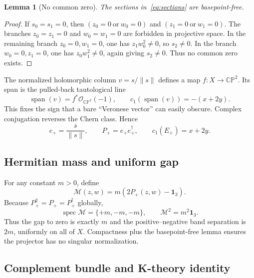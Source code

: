 \documentclass[11pt]{article}
\newtheorem{lemma}[theorem]{Lemma}
\theoremstyle{definition}
\theoremstyle{remark}
\newcommand{\CP}{\mathbb {CP}}
\newcommand{\cO}{\mathcal O}
\newcommand{\cM}{\mathcal M}
\begin{document}
\begin{lemma}[No common zero]
The sections in~\eqref{eq:sections} are basepoint-free.
\end{lemma}
\begin{proof}
If \(s_0=s_1=0\), then
\((z_0=0\ \text{or}\ w_0=0)\) and
\((z_1=0\ \text{or}\ w_1=0)\).  The branches
\(z_0=z_1=0\) and \(w_0=w_1=0\) are forbidden in projective space.  In the
remaining branch \(z_0=0,w_1=0\), one has
\(z_1w_0^2\ne0\), so \(s_2\ne0\).  In the branch
\(w_0=0,z_1=0\), one has \(z_0w_1^2\ne0\), again giving \(s_2\ne0\).
Thus no common zero exists.
\end{proof}

The normalized holomorphic column \(v=s/\lVert s\rVert\) defines a map
\(f:X\to\CP^2\).  Its span is the pulled-back tautological line
\[
 \operatorname{span}(v)=f^*\cO_{\CP^2}(-1),
 \qquad c_1(\operatorname{span}(v))=-(x+2y).
\]
This fixes the sign that a bare ``Veronese vector'' can easily obscure.
Complex conjugation reverses the Chern class.  Hence
\begin{equation}
 e_+=\frac{\overline{s}}{\lVert s\rVert},
 \qquad
 P_+=e_+e_+^\dagger,
 \qquad
 c_1(E_+)=x+2y.
 \label{eq:positive-projector}
\end{equation}

\subsection{Hermitian mass and uniform gap}

For any constant \(m>0\), define
\begin{equation}
 \cM(z,w)=m(2P_+(z,w)-\bm1_3).
 \label{eq:rank-three-mass}
\end{equation}
Because \(P_+^2=P_+=P_+^\dagger\) globally,
\begin{equation}
 \operatorname{spec}\cM=\{+m,-m,-m\},
 \qquad \cM^2=m^2\bm1_3.
 \label{eq:rank-three-spectrum}
\end{equation}
Thus the gap to zero is exactly \(m\) and the positive--negative band
separation is \(2m\), uniformly on all of \(X\).  Compactness plus the
basepoint-free lemma ensures the projector has no singular normalization.

\subsection{Complement bundle and K-theory identity}
\end{document}
